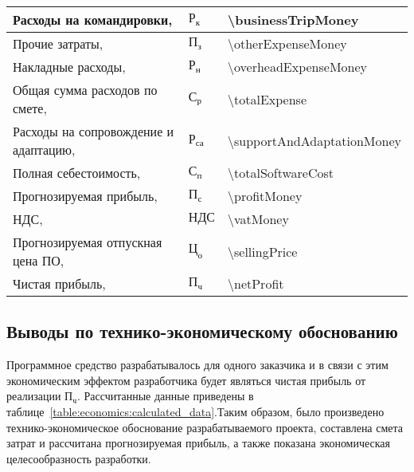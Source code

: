 \begin{longtable}{| >{\raggedright}m{}
                  | >{\centering}m{}
                  | >{\centering\arraybackslash}m{}|}
    Расходы на командировки, \byr{}
    & $ \text{Р}_\text{к} $
    & \num{\businessTripMoney}
    \\ \hline

    Прочие затраты, \byr{}
    & $ \text{П}_\text{з} $
    & \num{\otherExpenseMoney}
    \\ \hline

    Накладные расходы, \byr{}
    & $ \text{Р}_\text{н} $
    & \num{\overheadExpenseMoney}
    \\ \hline

    Общая сумма расходов по смете, \byr{}
    & $ \text{С}_\text{р} $
    & \num{\totalExpense}
    \\ \hline

    Расходы на сопровождение и адаптацию, \byr{}
    & $ \text{Р}_\text{са} $
    & \num{\supportAndAdaptationMoney}
    \\ \hline

    Полная себестоимость, \byr{}
    & $ \text{С}_\text{п} $
    & \num{\totalSoftwareCost}
    \\ \hline

    Прогнозируемая прибыль, \byr{}
    & $ \text{П}_\text{с} $
    & \num{\profitMoney}
    \\ \hline

    НДС, \byr{}
    & $ \text{НДС} $
    & \num{\vatMoney}
    \\ \hline

    Прогнозируемая отпускная цена ПО, \byr{}
    & $ \text{Ц}_\text{о} $
    & \num{\sellingPrice}
    \\ \hline

    Чистая прибыль, \byr{}
    & $ \text{П}_\text{ч} $
    & \num{\netProfit}
    \\ \hline
\end{longtable}



\subsection{Выводы по технико-экономическому обоснованию}

Программное средство разрабатывалось для одного заказчика и в связи с этим экономическим эффектом разработчика будет являться чистая прибыль от реализации $ \text{П}_\text{ч} $. Рассчитанные данные приведены в таблице~\ref{table:economics:calculated_data}.Таким образом, было произведено технико-экономическое обоснование разрабатываемого проекта, составлена смета затрат и рассчитана прогнозируемая прибыль, а также показана экономическая целесообразность разработки.

